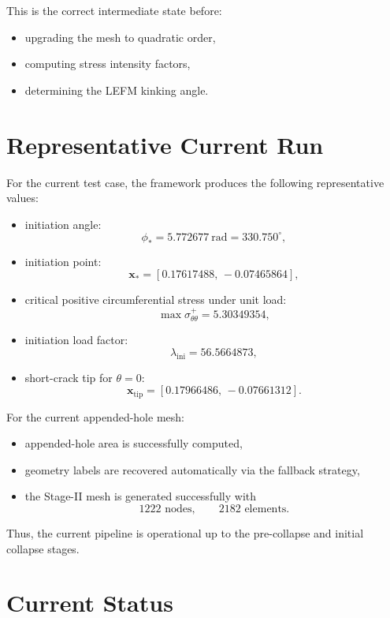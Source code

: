 \documentclass[11pt]{article}
\begin{document}
	This is the correct intermediate state before:
	\begin{itemize}
		\item upgrading the mesh to quadratic order,
		\item computing stress intensity factors,
		\item determining the LEFM kinking angle.
	\end{itemize}
	
	\section{Representative Current Run}
	
	For the current test case, the framework produces the following representative values:
	\begin{itemize}
		\item initiation angle:
		\[
		\phi_* = 5.772677~\text{rad} = 330.750^\circ,
		\]
		\item initiation point:
		\[
		\bm{x}_* = [0.17617488,\,-0.07465864],
		\]
		\item critical positive circumferential stress under unit load:
		\[
		\max \sigma_{\theta\theta}^{+} = 5.30349354,
		\]
		\item initiation load factor:
		\[
		\lambda_{\mathrm{ini}} = 56.5664873,
		\]
		\item short-crack tip for $\theta=0$:
		\[
		\bm{x}_{\mathrm{tip}} = [0.17966486,\,-0.07661312].
		\]
	\end{itemize}
	
	For the current appended-hole mesh:
	\begin{itemize}
		\item appended-hole area is successfully computed,
		\item geometry labels are recovered automatically via the fallback strategy,
		\item the Stage-II mesh is generated successfully with
		\[
		1222 \text{ nodes}, \qquad 2182 \text{ elements}.
		\]
	\end{itemize}
	
	Thus, the current pipeline is operational up to the pre-collapse and initial collapse stages.
	
	\section{Current Status}
	
\end{document}
